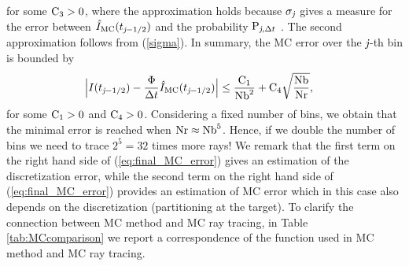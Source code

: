 for some $\textrm{C}_3>0$, where the approximation holds because $\sigma_{\textit{j}}$ gives a measure for the error between
$\hat{I}_{\textrm{MC}}(t_{\textit{j}-1/2})$ and the probability $\textrm{P}_{\textit{j}, \Delta t}$ \cite{diez2012openintro}. The second approximation follows from (\ref{sigma}). In summary, the MC error over the $\textit{j}$-th bin is bounded by
\begin{equation} \begin{aligned}
\Big|I(t_{\textit{j}-1/2})&-\frac{\Phi}
{\Delta t}\hat{I}_{\textrm{MC}}(t_{\textit{j}-1/2})\Big| \leq
\frac{\textrm{C}_1}{\textrm{Nb}^2} + \textrm{C}_4\sqrt{\frac{\textrm{Nb}}{\textrm{Nr}}},
\end{aligned}
\label{eq:final_MC_error}
\end{equation}
for some $\textrm{C}_1>0$ and $\textrm{C}_4>0$. 
Considering a fixed number of bins, we obtain that the minimal error is reached when $\textrm{Nr}\approx \textrm{Nb}^5$.
Hence, if we double the number of bins we need to trace $2^5 = 32$ times more rays!
We remark that the first term on the right hand side of (\ref{eq:final_MC_error}) gives an estimation of the discretization error, while the second term on the right hand side of (\ref{eq:final_MC_error}) provides an estimation of MC error which in this case also depends on the discretization (partitioning at the target). 
To clarify the connection between MC method and MC ray tracing, in Table \ref{tab:MCcomparison} we report a correspondence of the function used in MC method and MC ray tracing.

